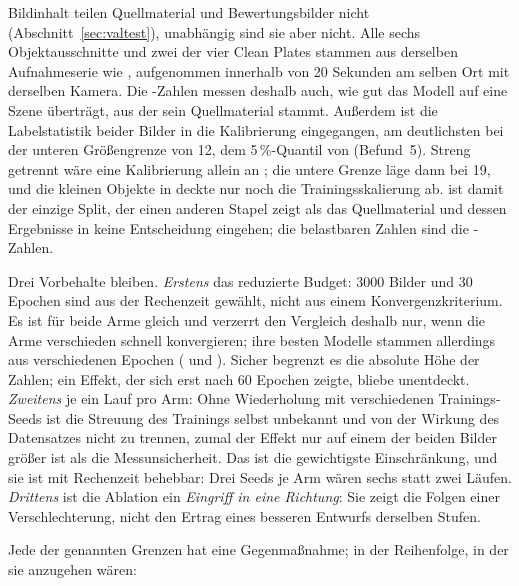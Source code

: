  Bildinhalt teilen Quellmaterial und
Bewertungsbilder nicht (Abschnitt~\ref{sec:valtest}), unabhängig sind sie aber
nicht. Alle sechs Objektausschnitte und zwei der vier Clean Plates stammen aus
derselben Aufnahmeserie wie , aufgenommen innerhalb von 20 Sekunden
am selben Ort mit derselben Kamera. Die -Zahlen messen deshalb auch,
wie gut das Modell auf eine Szene überträgt, aus der sein Quellmaterial stammt.
Außerdem ist die Labelstatistik beider Bilder in die Kalibrierung eingegangen,
am deutlichsten bei der unteren Größengrenze von 12\px, dem 5\,\%-Quantil von
 (Befund~5). Streng getrennt wäre eine Kalibrierung allein an
; die untere Grenze läge dann bei 19\px, und die kleinen Objekte in
 deckte nur noch die Trainingsskalierung ab.  ist damit
der einzige Split, der einen anderen Stapel zeigt als das Quellmaterial und
dessen Ergebnisse in keine Entscheidung eingehen; die
belastbaren Zahlen sind die -Zahlen.

 Drei Vorbehalte bleiben. \emph{Erstens} das
reduzierte Budget: 3000 Bilder und 30 Epochen sind aus der Rechenzeit gewählt,
nicht aus einem Konvergenzkriterium. Es ist für beide Arme gleich und verzerrt
den Vergleich deshalb nur, wenn die Arme verschieden schnell konvergieren; ihre
besten Modelle stammen allerdings aus verschiedenen Epochen
(\zCZeroBestEpoche{} und \zCOneBestEpoche). Sicher begrenzt es die absolute
Höhe der Zahlen; ein Effekt, der sich erst nach 60 Epochen zeigte, bliebe
unentdeckt.
\emph{Zweitens} je ein Lauf pro Arm: Ohne Wiederholung mit verschiedenen
Trainings-Seeds ist die Streuung des Trainings selbst unbekannt und von der
Wirkung des Datensatzes nicht zu trennen, zumal der Effekt nur auf einem der
beiden Bilder größer ist als die Messunsicherheit. Das ist die gewichtigste
Einschränkung, und sie ist mit Rechenzeit behebbar: Drei Seeds je Arm wären
sechs statt zwei Läufen. \emph{Drittens} ist die Ablation ein \emph{Eingriff
in eine Richtung}: Sie
zeigt die Folgen einer Verschlechterung, nicht den Ertrag eines besseren
Entwurfs derselben Stufen.

 Jede der genannten Grenzen hat eine Gegenmaßnahme;
in der Reihenfolge, in der sie anzugehen wären:

